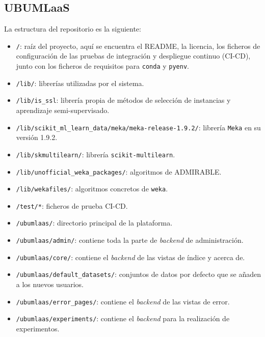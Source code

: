 \subsection{UBUMLaaS}
La estructura del repositorio es la siguiente:
\begin{itemize}
\tightlist
\item \texttt{/}: raíz del proyecto, aquí se encuentra el README, la licencia, los ficheros de configuración de las pruebas de integración y despliegue continuo (CI-CD), junto con los ficheros de requisitos para \texttt{conda} y \texttt{pyenv}. 
\item \texttt{/lib/}: librerías utilizadas por el sistema.
\item \texttt{/lib/is\_ssl}: librería propia de métodos de selección de instancias y aprendizaje semi-supervisado.
\item \texttt{/lib/scikit\_ml\_learn\_data/meka/meka-release-1.9.2/}: librería \texttt{Meka} en su versión 1.9.2.
\item \texttt{/lib/skmultilearn/}: librería \texttt{scikit-multilearn}.
\item \texttt{/lib/unofficial\_weka\_packages/}: algoritmos de ADMIRABLE.
\item \texttt{/lib/wekafiles/}: algoritmos concretos de \texttt{weka}.
\item \texttt{/test/*}: ficheros de prueba CI-CD.
\item \texttt{/ubumlaas/}: directorio principal de la plataforma.
\item \texttt{/ubumlaas/admin/}: contiene toda la parte de \textit{backend} de administración.
\item \texttt{/ubumlaas/core/}: contiene el \textit{backend} de las vistas de índice y acerca de.
\item \texttt{/ubumlaas/default\_datasets/}: conjuntos de datos por defecto que se añaden a los nuevos usuarios.
\item \texttt{/ubumlaas/error\_pages/}: contiene el \textit{backend} de las vistas de error.
\item \texttt{/ubumlaas/experiments/}: contiene el \textit{backend} para la realización de experimentos.
\end{itemize}

